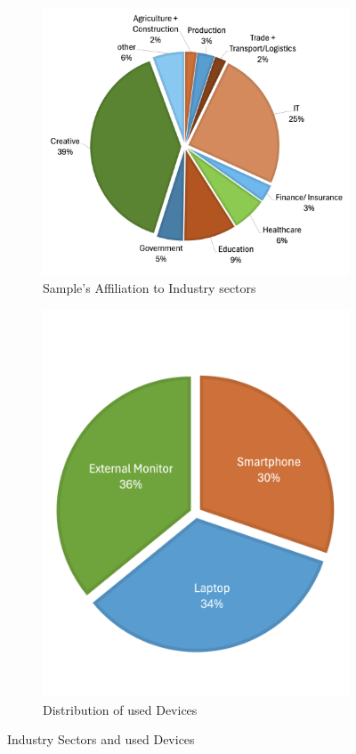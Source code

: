 \documentclass[
  a4paper,  %
  twoside,  %
  bibliography=totoc,
  headsepline,
  cleardoublepage=empty,
  parskip=half,
  draft=false
]{scrbook}
\begin{document}
\begin{figure}[h]
  \centering
  \begin{subfigure}{0.58\textwidth}
    \includegraphics[width=\linewidth]{graphics/images/statistics/piechart-sectors.png}
    \caption{Sample's Affiliation to Industry sectors}
    \label{fig:piechart-sectors}
  \end{subfigure}
  \begin{subfigure}{0.38\textwidth}
    \includegraphics[width=\linewidth]{graphics/images/statistics/piechart-devices.png}
    \caption{Distribution of used Devices}
    \label{fig:piechart-devices}
  \end{subfigure}
  \caption{Industry Sectors and used Devices}
\end{figure}
\end{document}
